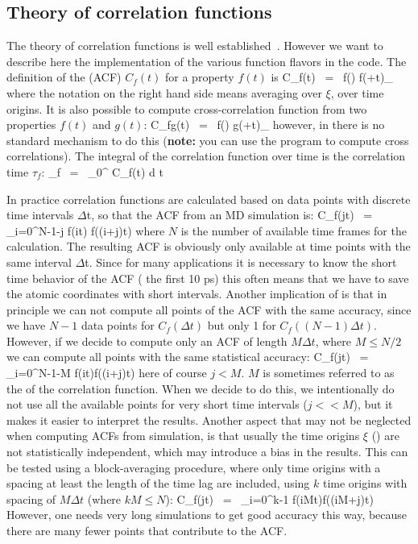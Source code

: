 \subsection{Theory of correlation functions}
The theory of correlation functions is well established~\cite{Allen87}.
However we want to describe here the implementation of the various 
 function flavors in the {\gromacs} code.
The definition of the  (ACF)
$C_f(t)$ for a property $f(t)$ is
\beq
C_f(t)  ~=~     \left\langle f(\xi) f(\xi+t)\right\rangle_{\xi}
\label{eqn:corr}
\eeq
where the notation on the right hand side means averaging over $\xi$, {\ie} over
time origins.
It is also possible to compute cross-correlation function from two properties
$f(t)$ and $g(t)$:
\beq
C_{fg}(t) ~=~   \left\langle f(\xi) g(\xi+t)\right\rangle_{\xi}
\eeq
however, in {\gromacs} there is no standard mechanism to do this
({\bf note:} you can use the {\tt {}} program to compute cross correlations).
The integral of the correlation function over time is the 
correlation time $\tau_f$:
\beq
\tau_f  ~=~     \int_0^{\infty} C_f(t) {\rm d} t
\label{eqn:corrtime}
\eeq

In practice correlation functions are calculated based on data points with
discrete time intervals {$\Delta$t}, so that the ACF from an MD simulation is:
\beq
C_f(j\Delta t)  ~=~     \sum_{i=0}^{N-1-j} f(i\Delta t) f((i+j)\Delta t)
\label{eqn:corrmd}
\eeq
where $N$ is the number of available time frames for the calculation.
The resulting ACF is
obviously only available at time points with the same interval {$\Delta$t}.
Since for many applications it is necessary to know  the short time behavior
of the ACF ({\eg} the first 10 ps) this often means that we have to save the
atomic coordinates with short intervals.
Another implication of  is that in principle we can not compute
all points of the ACF with the same accuracy, since we have $N-1$ data points
for $C_f(\Delta t)$ but only 1 for $C_f((N-1)\Delta t)$. However, if we decide to
compute only an ACF of length $M\Delta t$, where $M \leq N/2$ we can compute 
all points with the same statistical accuracy:
\beq
C_f(j\Delta t)  ~=~ \sum_{i=0}^{N-1-M} f(i\Delta t)f((i+j)\Delta t)
\eeq
here of course $j < M$.
$M$ is sometimes referred to as the  of the correlation function. 
When we decide to do this, we intentionally do not use all the available points
for very short time intervals ($j << M$), but it makes it easier to interpret
the results.
Another aspect that may not be neglected when computing
ACFs from simulation, is that usually the time origins $\xi$ ()
are not statistically independent, which may introduce a bias in the results.
This can be tested using a block-averaging procedure, where only time origins
with a spacing at least the length of the time lag are included, {\eg} using 
$k$ time origins with spacing of $M\Delta t$ (where $kM \leq N$):
\beq
C_f(j\Delta t)  ~=~ \sum_{i=0}^{k-1} f(iM\Delta t)f((iM+j)\Delta t)
\eeq
However, one
needs very long simulations to get good accuracy this way, because there are 
many fewer points that contribute to the ACF.

